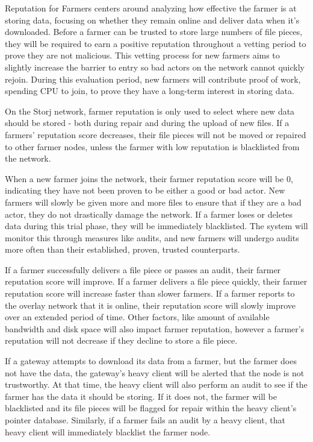 \documentclass[a4paper,10pt]{article} \usepackage[utf8]{inputenc}
\begin{document}
Reputation for Farmers centers around analyzing how effective the farmer is at storing data, focusing on whether they remain online and deliver data when it’s downloaded. Before a farmer can be trusted to store large numbers of file pieces, they will be required to earn a positive reputation throughout a vetting period to prove they are not malicious. This vetting process for new farmers aims to slightly increase the barrier to entry so bad actors on the network cannot quickly rejoin. During this evaluation period, new farmers will contribute proof of work, spending CPU to join, to prove they have a long-term interest in storing data. 

On the Storj network, farmer reputation is only used to select where new data should be stored - both during repair and during the upload of new files. If a farmers’ reputation score decreases, their file pieces will not be moved or repaired to other farmer nodes, unless the farmer with low reputation is blacklisted from the network. 

When a new farmer joins the network, their farmer reputation score will be 0, indicating they have not been proven to be either a good or bad actor. New farmers will slowly be given more and more files to ensure that if they are a bad actor, they do not drastically damage the network. If a farmer loses or deletes data during this trial phase, they will be immediately blacklisted. The system will monitor this through measures like audits, and new farmers will undergo audits more often than their established, proven, trusted counterparts. 

If a farmer successfully delivers a file piece or passes an audit, their farmer reputation score will improve. If a farmer delivers a file piece quickly, their farmer reputation score will increase faster than slower farmers. If a farmer reports to the overlay network that it is online, their reputation score will slowly improve over an extended period of time. Other factors, like amount of available bandwidth and disk space will also impact farmer reputation, however a farmer’s reputation will not decrease if they decline to store a file piece. 

If a gateway attempts to download its data from a farmer, but the farmer does not have the data, the gateway’s heavy client will be alerted that the node is not trustworthy. At that time, the heavy client will also perform an audit to see if the farmer has the data it should be storing. If it does not, the farmer will be blacklisted and its file pieces will be flagged for repair within the heavy client’s pointer database. Similarly, if a farmer fails an audit by a heavy client, that heavy client will immediately blacklist the farmer node.  
\end{document}
